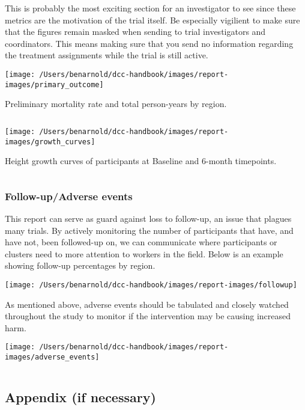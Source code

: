 \documentclass[
]{book}
\begin{document}
This is probably the most exciting section for an investigator to see since these metrics are the motivation of the trial itself. Be especially vigilient to make sure that the figures remain masked when sending to trial investigators and coordinators. This means making sure that you send no information regarding the treatment assignments while the trial is still active.

\texttt{[image: /Users/benarnold/dcc-handbook/images/report-images/primary\_outcome]}

Preliminary mortality rate and total person-years by region.

\(~\)

\texttt{[image: /Users/benarnold/dcc-handbook/images/report-images/growth\_curves]}

Height growth curves of participants at Baseline and 6-month timepoints.

\(~\)

\hypertarget{follow-upadverse-events}{%
\subsubsection{Follow-up/Adverse events}\label{follow-upadverse-events}}

This report can serve as guard against loss to follow-up, an issue that plagues many trials. By actively monitoring the number of participants that have, and have not, been followed-up on, we can communicate where participants or clusters need to more attention to workers in the field. Below is an example showing follow-up percentages by region.

\texttt{[image: /Users/benarnold/dcc-handbook/images/report-images/followup]}

As mentioned above, adverse events should be tabulated and closely watched throughout the study to monitor if the intervention may be causing increased harm.

\texttt{[image: /Users/benarnold/dcc-handbook/images/report-images/adverse\_events]}

\(~\)

\hypertarget{appendix-if-necessary}{%
\subsection{Appendix (if necessary)}\label{appendix-if-necessary}}
\end{document}
